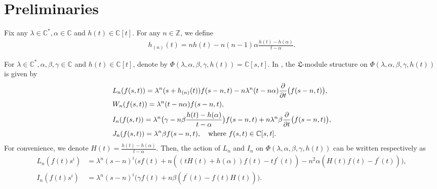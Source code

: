 \documentclass[12pt,leqno,amscd,amsfonts,amssymb]{amsart}
\def\la{\lambda}
\def\a{\alpha}
\def\b{\beta}
\def\r{\gamma}
\def\Z{\mathbb{Z}}
\def\C{\mathbb{C}}
\numberwithin{equation}{section}
\begin{document}
\section{Preliminaries}\label{pre}
Fix any $\lambda\in\C^*,\a\in\C$ and $h(t)\in\C[t]$. For any $n\in\Z$, we define
\begin{align*}
h_{(n)}(t)=n h(t)-n(n-1)\a\frac{h(t)-h(\a)}{t-\a}.
\end{align*}

For $\lambda\in\C^*,\a,\b,\r\in\C$ and $h(t)\in\C[t]$, denote by $\Phi(\lambda,\a,\b,\r,h(t))=\C [s,t]$. In \cite{CG}, the $\mathfrak L$-module structure on $\Phi(\lambda,\a,\b,\r,h(t))$ is given by
\begin{equation*}
\aligned
&L_n(f(s,t))=\lambda^n(s+h_{(n)}(t))f(s-n,t)-n\lambda^n(t-n\a)\frac{\partial}{\partial t}\big(f(s-n,t)\big),\\
&W_n(f(s,t))=\lambda^n(t-n\a)f(s-n,t),\\
&I_n(f(s,t))=\la^n\big(\r-n\b \frac{h(t)-h(\a)}{t-\a}\big)f(s-n,t)+n\la^n\b \frac{\partial}{\partial t}\big(f(s-n,t)\big),\\
&J_n(f(s,t))=\la^n\b f(s-n,t), \quad {\rm where}\,\, f(s,t)\in\C[s,t].
\endaligned
\end{equation*}
For convenience, we denote $H(t)=\frac{h(t)-h(\a)}{t-\a}$.   Then, the action of $L_n$ and $I_n$ on $\Phi(\lambda,\a,\b,\r,h(t))$ can be written respectively as
\begin{align*}
L_n(f(t)s^i)&=\lambda^n(s-n)^i\big(sf(t)+n((tH(t)+h(\a))f(t)-tf^{\prime}(t))-n^2\a(H(t)f(t)-f^{\prime}(t))\big),\\
I_n(f(t)s^i)&=\lambda^n(s-n)^i\big(\r f(t)+n\b(f^{\prime}(t)-f(t)H(t))\big).
\end{align*}
\end{document}
